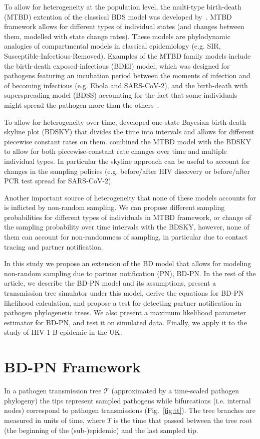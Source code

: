 \documentclass[a4paper,10pt]{article}
\begin{document}
To allow for heterogeneity at the population level, the multi-type birth-death (MTBD) extention of the classical BDS model was developed by~\citet{Stadler2013a}. MTBD framework allows for different types of individual states (and changes between them, modelled with state change rates). These models are phylodynamic analogies of compartmental models in classical epidemiology (e.g. SIR, Susceptible-Infectious-Removed).  Examples of the MTBD family models include the birth-death exposed-infectious (BDEI) model, which was designed for pathogens featuring an incubation period between the moments of infection and of becoming infectious (e.g. Ebola and SARS-CoV-2), and the birth-death with superspreading model (BDSS) accounting for the fact that some individuals might spread the pathogen more than the others~\citep{Stadler2014}.

To allow for heterogeneity over time, \citet{Stadler2013} developed one-state Bayesian birth-death skyline plot (BDSKY) that divides the time into intervals and allows for different piecewise constant rates on them. \citet{Kuhnert2016} combined the MTBD model with the BDSKY to allow for both piecewise-constant rate changes over time and multiple individual types. In particular the skyline approach can be useful to account for changes in the sampling policies (e.g. before/after HIV discovery or before/after PCR test spread for SARS-CoV-2).


Another important source of heterogeneity that none of these models accounts for is inflicted by non-random sampling. We can propose different sampling probabilities for different types of individuals in MTBD framework, or change of the sampling probability over time intervals with the BDSKY, however, none of them can account for non-randomness of sampling, in particular due to contact tracing and partner notification. 

In this study we propose an extension of the BD model that allows for modeling non-random sampling due to partner notification (PN), BD-PN. In the rest of the article, we describe the BD-PN model and its assumptions, present a transmission tree simulator under this model, derive the equations for BD-PN likelihood calculation, and propose a test for detecting partner notification in pathogen phylogenetic trees. We also present a maximum likelihood parameter estimator for BD-PN, and test it on simulated data. Finally, we apply it to the study of HIV-1 B epidemic in the UK. 


\section{BD-PN Framework}
In a pathogen transmission tree $\mathscr{T}$ (approximated by a time-scaled pathogen phylogeny) the tips represent sampled pathogens %
while bifurcations (i.e. internal nodes) correspond to pathogen transmissions (Fig.~\ref{fig:tt}). The tree branches are measured in units of time, where $T$ is the time that passed between the tree root (the beginning of the (sub-)epidemic) and the last sampled tip. 
\end{document}
